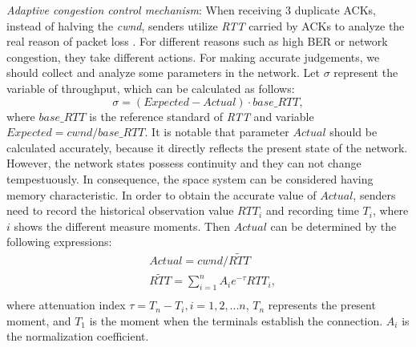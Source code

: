 \documentclass[draftclsnofoot,onecolumn,11pt]{IEEEtran}
\begin{document}
  \emph{Adaptive congestion control mechanism}: When receiving 3 duplicate ACKs, instead of halving the \emph{cwnd}, senders utilize \emph{RTT} carried by ACKs to analyze the real reason of packet loss \cite{fu2003tcp}. For different reasons such as high BER or network congestion, they take different actions. For making accurate judgements, we should collect and analyze some parameters in the network.
 Let $\sigma$ represent the variable of throughput, which can be calculated as follows:
 \begin{equation}\label{2}
\sigma=(Expected-Actual)\cdot base\_RTT,
 \end{equation}
where $base\_RTT$ is the reference standard of \emph{RTT} and variable $Expected\!\!=\!\!cwnd/base\_RTT$. It is notable that parameter $Actual$ should be calculated accurately, because it directly reflects the present state of the network. However, the network states possess continuity and they can not change tempestuously. In consequence, the space system can be considered having memory characteristic. In order to obtain the accurate value of $Actual$, senders need to record the historical observation value $RTT_i$ and recording time $T_i$, where $i$ shows the different measure moments. Then $Actual$ can be determined by the following expressions:
  \begin{equation}\label{3}
   \begin{aligned}
&Actual=cwnd/\widetilde{RTT}\\
&\widetilde{RTT}=\sum_{i=1}^{n}A_{i}e^{-\tau}RTT_{i},\\
   \end{aligned}
  \end{equation}
where attenuation index $\tau=T_{n}-T_{i}, i=1,2,...n$, $T_n$ represents the present moment, and $T_1$ is the moment when the terminals establish the connection. $A_{i}$ is the normalization coefficient.
\end{document}
